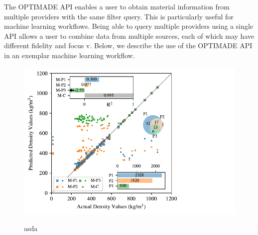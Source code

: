 \documentclass{article}
\begin{document}
	The OPTIMADE API enables a user to obtain material information from multiple providers with the same filter query. This is particularly useful for machine learning workflows. Being able to query multiple providers using a single API allows a user to combine data from multiple sources, each of which may have different fidelity and focus v. Below, we describe the use of the OPTIMADE API in an exemplar machine learning workflow.
		
	
%	
%	
%	
	
	

	\begin{figure}
		\centering
		\caption{asda}
		\includegraphics[]{highEntropyExample.pdf}
		\label{fig: }
	\end{figure}
\end{document}
